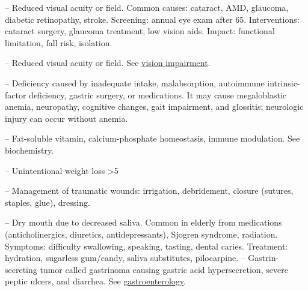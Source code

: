 -- Reduced visual acuity or field. Common causes: cataract, AMD, glaucoma, diabetic retinopathy, stroke. Screening: annual eye exam after 65. Interventions: cataract surgery, glaucoma treatment, low vision aids. Impact: functional limitation, fall risk, isolation.

-- Reduced visual acuity or field. See \hyperlink{Vision Impairment}{vision impairment}.

-- Deficiency caused by inadequate intake, malabsorption, autoimmune intrinsic-factor deficiency, gastric surgery, or medications. It may cause megaloblastic anemia, neuropathy, cognitive changes, gait impairment, and glossitis; neurologic injury can occur without anemia.

-- Fat-soluble vitamin, calcium-phosphate homeostasis, immune modulation. See biochemistry.

-- Unintentional weight loss >5%

-- Management of traumatic wounds: irrigation, debridement, closure (sutures, staples, glue), dressing.

-- Dry mouth due to decreased saliva. Common in elderly from medications (anticholinergics, diuretics, antidepressants), Sjogren syndrome, radiation. Symptoms: difficulty swallowing, speaking, tasting, dental caries. Treatment: hydration, sugarless gum/candy, saliva substitutes, pilocarpine.
-- Gastrin-secreting tumor called gastrinoma causing gastric acid hypersecretion, severe peptic ulcers, and diarrhea. See \hyperlink{Gastroenterology}{gastroenterology}.
